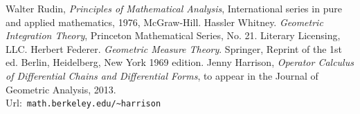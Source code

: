 \documentclass[12pt,a4paper]{article}
\begin{document}
%
%
%
\begin{thebibliography}{1}
%
 Walter Rudin,
  {\em Principles of Mathematical Analysis},
  International series in pure and applied mathematics,
  1976, McGraw-Hill.
 Hassler Whitney. {\em Geometric Integration Theory},
  Princeton Mathematical Series, No. 21. Literary Licensing, LLC.
 Herbert Federer. {\em Geometric Measure Theory}. Springer,        
  Reprint of the 1st ed. Berlin, Heidelberg, New York 1969 edition.
 Jenny Harrison, {\em Operator Calculus of Differential
  Chains and Differential Forms}, to appear in the Journal of Geometric
  Analysis, 2013. \\
  Url:\ {\small {\tt math.berkeley.edu/\textasciitilde harrison}}
\end{thebibliography}
%
\end{document}
